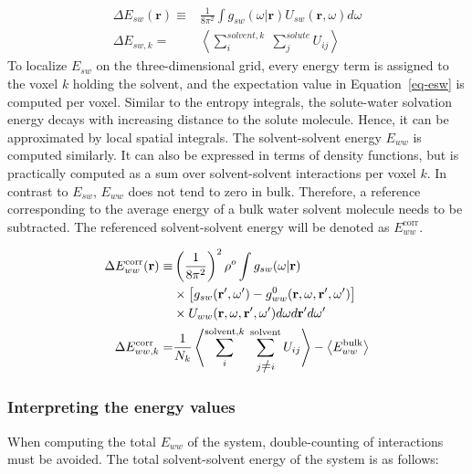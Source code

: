 \documentclass[9pt,tutorial]{livecoms}
\renewcommand{\neq}{\setbox0\hbox{=}\rlap{\hbox to \wd0{\hss /\hss}}\box0}
\begin{document}
\begin{equation}
	\begin{aligned}
		\label{eq-esw}
		\Delta E_{sw}(\textbf{r}) \equiv& \frac{1}{8\pi^2} \int g_\textit{sw}\left(\omega|\textbf{r}\right) U_\textit{sw}\left(\textbf{r}, \omega\right) d\omega \\
		\Delta E_{sw,k}=& \left\langle \sum_i^{\textit{solvent},k} \; \sum_j^\textit{solute} U_{ij}\right\rangle
	\end{aligned}
\end{equation}
To localize $E_{sw}$ on the three-dimensional grid, every energy term is assigned to the voxel $k$ holding the solvent, and the expectation value in Equation~\ref{eq-esw} is computed per voxel.
Similar to the entropy integrals, the solute-water solvation energy decays with increasing distance to the solute molecule.
Hence, it can be approximated by local spatial integrals. 
The solvent-solvent energy $E_{ww}$ is computed similarly.
It can also be expressed in terms of density functions, but is practically computed as a sum over solvent-solvent interactions per voxel $k$.
In contrast to $E_{sw}$, $E_{ww}$ does not tend to zero in bulk.
Therefore, a reference corresponding to the average energy of a bulk water solvent molecule needs to be subtracted.
The referenced solvent-solvent energy will be denoted as $E_{ww}^\text{corr}$.

\begin{equation}
	\begin{aligned}
		\Delta E_{ww}^\text{corr}(\textbf{r}) \equiv & \left(\frac{1}{8\pi^2} \right)^2 \rho^o \int g_{sw}(\omega|\textbf{r}) \\
			& \times \left[g_{sw}(\textbf{r}^\prime , \omega^\prime) - g^0_{ww} (\textbf{r}, \omega, \textbf{r}^\prime, \omega^\prime )\right] \\
			& \times U_{ww}(\textbf{r}, \omega, \textbf{r}^\prime, \omega^\prime)d\omega d\textbf{r}^\prime d\omega^\prime \\
		\Delta E_{ww,k}^\text{corr} =& \frac{1}{N_k} \left\langle \sum_i^{\text{solvent},k} \; \sum_{j \neq i}^\text{solvent} U_{ij}\right\rangle - \left\langle E_{ww}^\text{bulk}\right\rangle
	\end{aligned}
\end{equation}

\subsubsection{Interpreting the energy values}
When computing the total $E_{ww}$ of the system, double-counting of interactions must be avoided.
The total solvent-solvent energy of the system is as follows:
\end{document}
